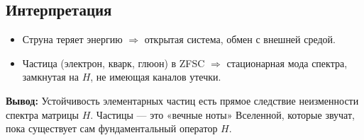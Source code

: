 \documentclass[12pt,a4paper]{article}
\begin{document}
\subsection*{Интерпретация}
\begin{itemize}
  \item Струна теряет энергию $\Rightarrow$ открытая система, обмен с внешней средой.  
  \item Частица (электрон, кварк, глюон) в ZFSC $\Rightarrow$ стационарная мода спектра, замкнутая на $H$, не имеющая каналов утечки.
\end{itemize}

\textbf{Вывод:} 
Устойчивость элементарных частиц есть прямое следствие 
неизменности спектра матрицы $H$. 
Частицы — это «вечные ноты» Вселенной, которые звучат, пока существует сам фундаментальный оператор $H$.
\end{document}
